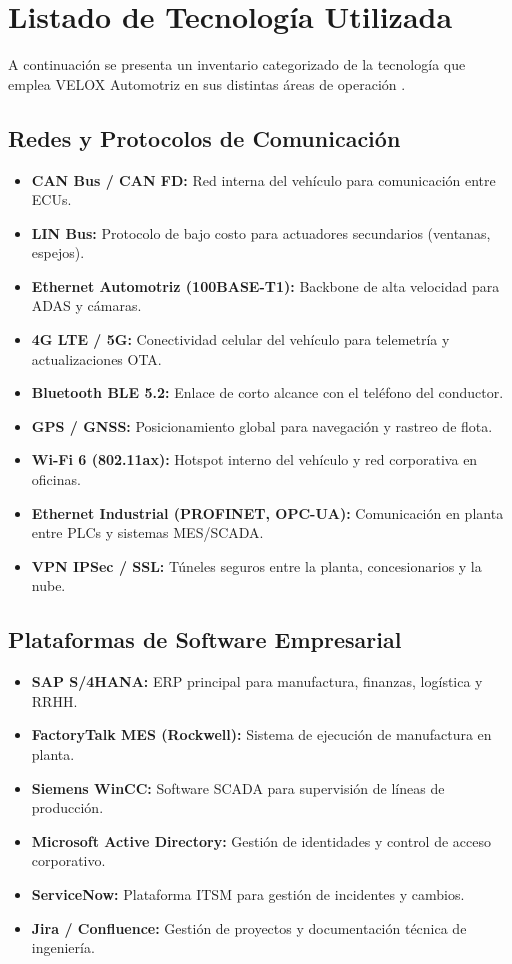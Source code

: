 \documentclass[letterpaper,11pt]{article}
\begin{document}
\section{Listado de Tecnología Utilizada}

A continuación se presenta un inventario categorizado de la tecnología que emplea VELOX Automotriz en sus distintas áreas de operación \autocite{sae-21434}.

\subsection{Redes y Protocolos de Comunicación}
\begin{itemize}[leftmargin=1.5cm]
    \item \textbf{CAN Bus / CAN FD:} Red interna del vehículo para comunicación entre ECUs.
    \item \textbf{LIN Bus:} Protocolo de bajo costo para actuadores secundarios (ventanas, espejos).
    \item \textbf{Ethernet Automotriz (100BASE-T1):} Backbone de alta velocidad para ADAS y cámaras.
    \item \textbf{4G LTE / 5G:} Conectividad celular del vehículo para telemetría y actualizaciones OTA.
    \item \textbf{Bluetooth BLE 5.2:} Enlace de corto alcance con el teléfono del conductor.
    \item \textbf{GPS / GNSS:} Posicionamiento global para navegación y rastreo de flota.
    \item \textbf{Wi-Fi 6 (802.11ax):} Hotspot interno del vehículo y red corporativa en oficinas.
    \item \textbf{Ethernet Industrial (PROFINET, OPC-UA):} Comunicación en planta entre PLCs y sistemas MES/SCADA.
    \item \textbf{VPN IPSec / SSL:} Túneles seguros entre la planta, concesionarios y la nube.
\end{itemize}

\subsection{Plataformas de Software Empresarial}
\begin{itemize}[leftmargin=1.5cm]
    \item \textbf{SAP S/4HANA:} ERP principal para manufactura, finanzas, logística y RRHH.
    \item \textbf{FactoryTalk MES (Rockwell):} Sistema de ejecución de manufactura en planta.
    \item \textbf{Siemens WinCC:} Software SCADA para supervisión de líneas de producción.
    \item \textbf{Microsoft Active Directory:} Gestión de identidades y control de acceso corporativo.
    \item \textbf{ServiceNow:} Plataforma ITSM para gestión de incidentes y cambios.
    \item \textbf{Jira / Confluence:} Gestión de proyectos y documentación técnica de ingeniería.
\end{itemize}
\end{document}
